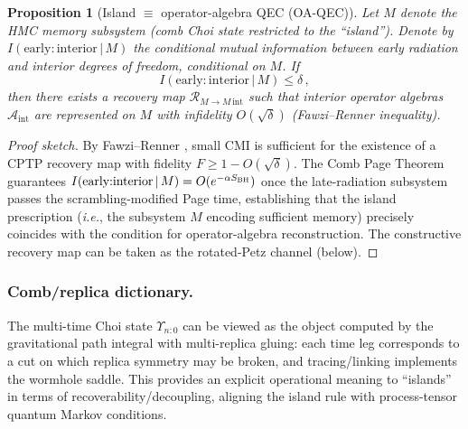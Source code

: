 \documentclass[aps,prd,preprint,onecolumn,superscriptaddress,nofootinbib,longbibliography,floatfix,11pt,showpacs,showkeys]{revtex4-2}
\newcommand{\ie}{\textit{i.e.}\xspace}
\newcommand{\HMC}{\textsc{HMC}\xspace}
\theoremstyle{plain}
\newtheorem{proposition}[theorem]{Proposition}
\theoremstyle{definition}
\theoremstyle{remark}
\begin{document}
\begin{proposition}[Island $\equiv$ operator-algebra QEC (OA-QEC)]
\label{prop:island-oa-qec}
Let $M$ denote the \HMC{} memory subsystem (comb Choi state restricted to the ``island''). Denote by $I(\text{early}{:}\text{interior}\,|\,M)$ the conditional mutual information between early radiation and interior degrees of freedom, conditional on $M$.
If 
\[
I(\text{early}{:}\text{interior}\,|\,M)\leq \delta\,,
\]
then there exists a recovery map $\mathcal{R}_{M\to M\,\text{int}}$ such that interior operator algebras $\mathcal{A}_{\text{int}}$ are represented on $M$ with infidelity $O(\sqrt{\delta})$ (Fawzi--Renner inequality).
\end{proposition}
\begin{proof}[Proof sketch]
By Fawzi--Renner \cite{FawziRenner:2015}, small CMI is sufficient for the existence of a CPTP recovery map with fidelity $F\geq 1-O(\sqrt{\delta})$. 
The Comb Page Theorem guarantees $I(\text{early}{:}\text{interior}\,|\,M)=O(e^{-\alpha S_{\rm BH}})$ once the late-radiation subsystem passes the scrambling-modified Page time, establishing that the island prescription (\ie, the subsystem $M$ encoding sufficient memory) precisely coincides with the condition for operator-algebra reconstruction.
The constructive recovery map can be taken as the rotated-Petz channel (below).
\end{proof}

\subsubsection{Comb/replica dictionary.}
The multi-time Choi state $\Upsilon_{n{:}0}$ can be viewed as the object computed by the gravitational path integral with multi-replica gluing:
each time leg corresponds to a cut on which replica symmetry may be broken, and tracing/linking implements the wormhole saddle.
This provides an explicit operational meaning to ``islands'' in terms of recoverability/decoupling, aligning the island rule with process-tensor quantum Markov conditions.
\end{document}
